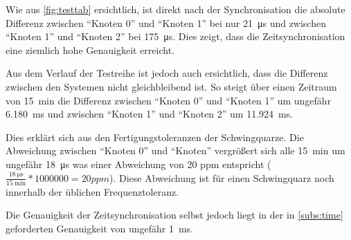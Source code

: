 Wie aus \autoref{fig:testtab} ersichtlich, ist direkt nach der Synchronisation
die absolute Differenz zwischen "`Knoten 0"' und "`Knoten 1"' bei nur
\SI{21}{\us} und zwischen "`Knoten 1"' und "`Knoten 2"' bei \SI{175}{\us}. Dies
zeigt, dass die Zeitsynchronisation eine ziemlich hohe Genauigkeit erreicht.

Aus dem Verlauf der Testreihe ist jedoch auch ersichtlich, dass die Differenz
zwischen den Systemen nicht gleichbleibend ist. So steigt über einen Zeitraum
von \SI{15}{\minute} die Differenz zwischen "`Knoten 0"' und "`Knoten 1"' um
ungefähr \SI{6,180}{\ms} und zwischen "`Knoten 1"' und "`Knoten 2"' um
\SI{11,924}{\ms}.

Dies erklärt sich aus den Fertigungstoleranzen der Schwingquarze. Die Abweichung
zwischen "`Knoten 0"' und "`Knoten"' vergrößert sich alle \SI{15}{\minute} um
ungefähr \SI{18}{\us} was einer Abweichung von 20 ppm entspricht
($\frac{\SI{18}{\us}}{\SI{15}{\minute}}*1000000=20\mathit{ppm}$).
Diese Abweichung ist für einen Schwingquarz noch innerhalb der üblichen
Frequenztoleranz.

Die Genauigkeit der Zeitsynchronisation selbst jedoch liegt in der in
\autoref{subs:time} geforderten Genauigkeit von ungefähr \SI{1}{\ms}.
